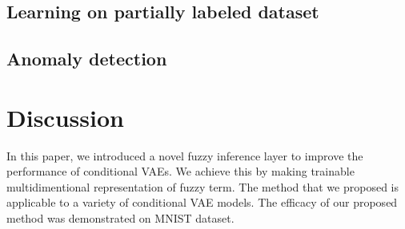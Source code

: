 \documentclass[runningheads]{llncs}
\begin{document}
\subsection{Learning on partially labeled dataset}

\subsection{Anomaly detection}

\section{Discussion}

In this paper, we introduced a novel fuzzy inference layer to improve the performance of conditional VAEs. 
We achieve this by making trainable multidimentional representation of fuzzy term.
The method that we proposed is applicable to a variety of conditional VAE models. 
The efficacy of our proposed method was demonstrated on MNIST dataset. 



\end{document}
